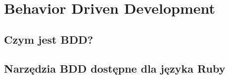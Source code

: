 \chapter[Behavior Driven Development]{Behavior Driven Development}
  \section{Czym jest BDD?}
  \section{Narzędzia BDD dostępne dla języka Ruby}

